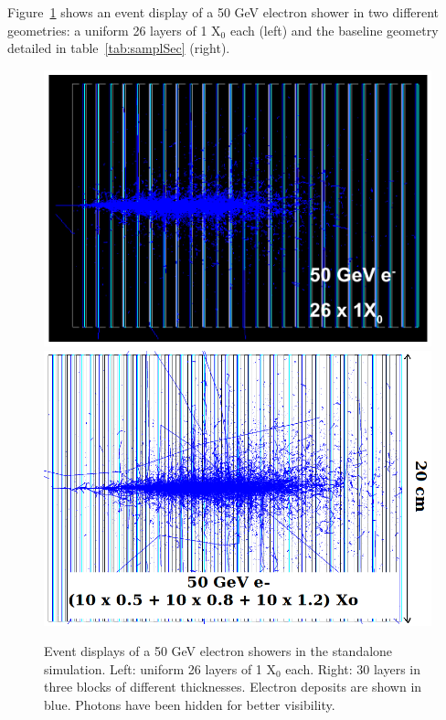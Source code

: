 Figure~\ref{fig:g4vis} shows an event display of a 50 GeV electron
shower in two different geometries: a uniform 26 layers of 1 X$_0$
each (left) and the baseline geometry detailed in
table~\ref{tab:samplSec} (right).

\begin{figure}[h!]
  \begin{center}
    \includegraphics[width=\cmsFigWidth]{figures/e_50GeV_uniform_26x0.png}
    \includegraphics[width=\cmsFigWidth]{figures/e_50GeV_concept_v3.png}
    \caption{Event displays of a 50 GeV electron showers in the
      standalone simulation. Left: uniform 26 layers of 1 X$_0$
      each. Right: 30 layers in three blocks of different
      thicknesses. Electron deposits are shown in blue. Photons have
      been hidden for better visibility.}
    \label{fig:g4vis}
  \end{center}
\end{figure}

